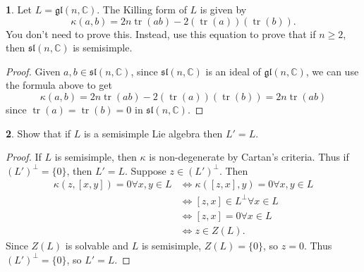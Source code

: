 \documentclass[12pt]{article}
\DeclareMathOperator{\tr}{tr}
\newcommand{\gl}{\mathfrak{gl}}
\renewcommand{\sl}{\mathfrak{sl}}
\theoremstyle{definition}
\newtheorem{ex}{}
\begin{document}
\begin{ex}
	Let $L = \gl(n, \mathbb{C})$.
	The Killing form of $L$ is given by \begin{equation*}
		\kappa(a, b) = 2n\tr(ab) - 2(\tr(a))(\tr(b)).
	\end{equation*}
	You don't need to prove this.
	Instead, use this equation to prove that if $n \geq 2$, then $\sl(n, \mathbb{C})$ is semisimple.
\end{ex}
\begin{proof}
  Given $a, b \in \sl(n, \mathbb{C})$, since $\sl(n, \mathbb{C})$ is an ideal of $\gl(n, \mathbb{C})$, we can use the formula above to get \begin{equation*}
    \kappa(a, b) = 2n \tr(ab) - 2(\tr(a))(\tr(b)) = 2n\tr(ab)
  \end{equation*}
  since $\tr(a) = \tr(b) = 0$ in $\sl(n, \mathbb{C})$.
\end{proof}

\begin{ex}
	Show that if $L$ is a semisimple Lie algebra then $L' = L$.
\end{ex}
\begin{proof}
  If $L$ is semisimple, then $\kappa$ is non-degenerate by Cartan's criteria.
  Thus if $(L')^\perp = \lbrace 0 \rbrace$, then $L' = L$.
  Suppose $z \in (L')^\perp$.
  Then \begin{align*}
    \kappa(z, [x, y]) = 0 \forall x, y \in L & \iff \kappa([z, x], y) = 0 \forall x, y \in L \\
                                       & \iff [z, x] \in L^\perp  \forall x \in L \\
                                       & \iff [z, x] = 0 \forall x \in L \\
                                       & \iff z \in Z(L).
  \end{align*}
  Since $Z(L)$ is solvable and $L$ is semisimple, $Z(L) = \lbrace 0 \rbrace$, so $z = 0$.
  Thus $(L')^\perp = \lbrace 0 \rbrace$, so $L' = L$.
\end{proof}
\end{document}
